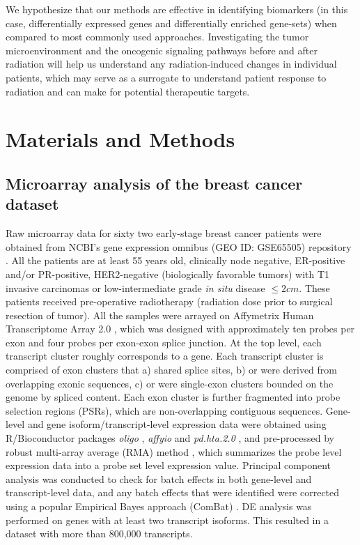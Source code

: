 \documentclass[hidelinks,11pt]{article}
\begin{document}
We hypothesize that our methods are effective in identifying biomarkers (in this case, differentially expressed genes and differentially enriched gene-sets) when compared to most commonly used approaches. Investigating the tumor microenvironment and the oncogenic signaling pathways before and after radiation will help us understand any radiation-induced changes in individual patients, which may serve as a surrogate to understand patient response to radiation and can make for potential therapeutic targets.

\section*{Materials and Methods}

\subsection*{Microarray analysis of the breast cancer dataset}

Raw microarray data for sixty two early-stage breast cancer patients were obtained from NCBI's gene expression omnibus (GEO ID: GSE65505) repository \cite{GEO}. All the patients are at least 55 years old, clinically node negative, ER-positive and/or PR-positive, HER2-negative (biologically favorable tumors) with T1 invasive carcinomas or low-intermediate grade \emph{in situ} disease $\leq 2cm$. These patients received pre-operative radiotherapy (radiation dose prior to surgical resection of tumor). All the samples were arrayed on Affymetrix Human Transcriptome Array 2.0 \cite{affymetrix}, which was designed with approximately ten probes per exon and four probes per exon-exon splice junction. At the top level, each transcript cluster roughly corresponds to a gene. Each transcript cluster is comprised of exon clusters that  a) shared splice sites, b) or were derived from overlapping exonic sequences, c) or were single-exon clusters bounded on the genome by spliced content. Each exon cluster is further fragmented into probe selection regions (PSRs), which are non-overlapping contiguous sequences. Gene-level and gene isoform/transcript-level expression data were obtained using R/Bioconductor packages \emph{oligo} \cite{oligo}, \emph{affyio} \cite{affyio} and \emph{pd.hta.2.0} \cite{pdhta}, and pre-processed by robust multi-array average (RMA) method \cite{iri,oligo,affyio}, which summarizes the probe level expression data into a probe set level expression value. Principal component analysis was conducted to check for batch effects in both gene-level and transcript-level data, and any batch effects that were identified were corrected using a popular Empirical Bayes approach (ComBat) \cite{combat}. DE analysis was performed on genes with at least two transcript isoforms. This resulted in a dataset with more than 800,000 transcripts. 
\end{document}
